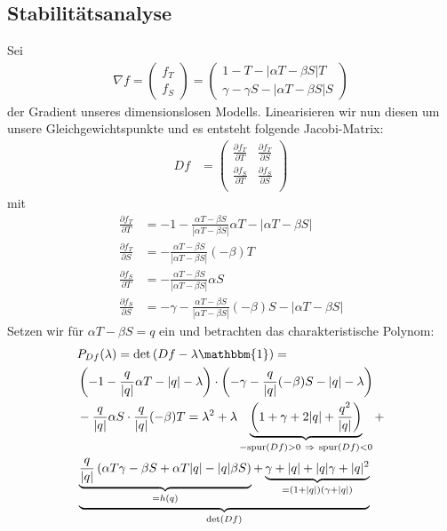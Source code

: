 \documentclass[a4paper,twoside]{article}
\begin{document}
	\subsection{Stabilitätsanalyse}
	Sei
	\begin{align*}
		\nabla f = \left(\begin{array}{c}
			f_T \\
			f_S
		\end{array}\right) = \left(\begin{array}{c}
			1 - T - |\alpha T - \beta S|T \\
			\gamma - \gamma S - |\alpha T - \beta S|S
		\end{array}\right)
	\end{align*}
	der Gradient unseres dimensionslosen Modells. Linearisieren wir nun diesen um unsere Gleichgewichtspunkte und es entsteht folgende Jacobi-Matrix:
	\begin{align*}
		Df &= \left(\begin{array}{cc}
			\frac{\partial f_T}{\partial T} & \frac{\partial f_T}{\partial S} \\
			\frac{\partial f_S}{\partial T} & \frac{\partial f_S}{\partial S} \\
		\end{array}\right)
	\end{align*}
	mit
	\begin{align*}
		\frac{\partial f_T}{\partial T} &= -1 - \frac{\alpha T - \beta S}{|\alpha T - \beta S|}\alpha T - |\alpha T - \beta S| \\
		 \frac{\partial f_T}{\partial S} &= -\frac{\alpha T - \beta S}{|\alpha T - \beta S|}(-\beta) T \\
		 \frac{\partial f_S}{\partial T} &= -\frac{\alpha T - \beta S}{|\alpha T - \beta S|}\alpha S \\
		 \frac{\partial f_S}{\partial S} &= -\gamma -\frac{\alpha T - \beta S}{|\alpha T - \beta S|}(-\beta) S - |\alpha T - \beta S|
	\end{align*}
	Setzen wir für \(\alpha T - \beta S = q\) ein und betrachten das charakteristische Polynom:
	\begin{align*}
		&P_{Df}(\lambda) = \textrm{det}\left( Df - \lambda  \mathbbm{1} \right) = \\
		&\left(-1 - \frac{q}{|q|}\alpha T - |q| - \lambda\right) \cdot \left( -\gamma - \frac{q}{|q|}(-\beta) S - |q|- \lambda \right)\\
		& - \frac{q}{|q|}\alpha S \cdot  \frac{q}{|q|}(-\beta) T = 
		\lambda^2 + \lambda \underbrace{\left( 1  + \gamma + 2|q| + \frac{q^2}{|q|} \right)}_{-\textrm{spur}(Df) > 0 ~\Rightarrow~ \textrm{spur}(Df) < 0} + \\
		& \underbrace{
			\underbrace{\frac{q}{|q|}\left(\alpha T \gamma - \beta S + \alpha T |q| - |q|\beta S\right)}_{=h(q)}
			 + \underbrace{\gamma + |q| + |q|\gamma + |q|^2}_{=(1 + |q|)(\gamma + |q|)}
		}_{\textrm{det}(Df)}
	\end{align*}
\end{document}
